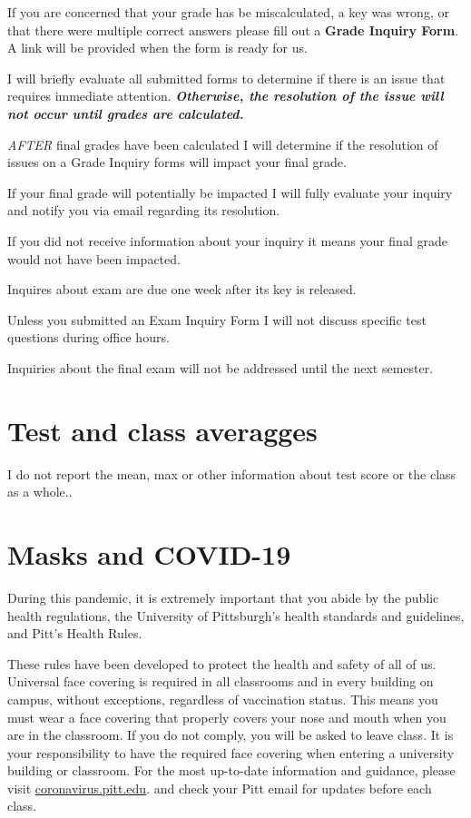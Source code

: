 \documentclass[
]{book}
\begin{document}
If you are concerned that your grade has be miscalculated, a key was wrong, or that there were multiple correct answers please fill out a \textbf{Grade Inquiry Form}. A link will be provided when the form is ready for us.

I will briefly evaluate all submitted forms to determine if there is an issue that requires immediate attention. \textbf{\emph{Otherwise, the resolution of the issue will not occur until grades are calculated.}}

\emph{AFTER} final grades have been calculated I will determine if the resolution of issues on a Grade Inquiry forms will impact your final grade.

If your final grade will potentially be impacted I will fully evaluate your inquiry and notify you via email regarding its resolution.

If you did not receive information about your inquiry it means your final grade would not have been impacted.

Inquires about exam are due one week after its key is released.

Unless you submitted an Exam Inquiry Form I will not discuss specific test questions during office hours.

Inquiries about the final exam will not be addressed until the next semester.

\hypertarget{test-and-class-averagges}{%
\chapter{Test and class averagges}\label{test-and-class-averagges}}

I do not report the mean, max or other information about test score or the class as a whole..

\hypertarget{masks-and-covid-19}{%
\chapter{Masks and COVID-19}\label{masks-and-covid-19}}

During this pandemic, it is extremely important that you abide by the public health regulations, the University of Pittsburgh's health standards and guidelines, and Pitt's Health Rules.

These rules have been developed to protect the health and safety of all of us. Universal face covering is required in all classrooms and in every building on campus, without exceptions, regardless of vaccination status. This means you must wear a face covering that properly covers your nose and mouth when you are in the classroom. If you do not comply, you will be asked to leave class. It is your responsibility to have the required face covering when entering a university building or classroom. For the most up-to-date information and guidance, please visit \url{coronavirus.pitt.edu}. and check your Pitt email for updates before each class.
\end{document}

